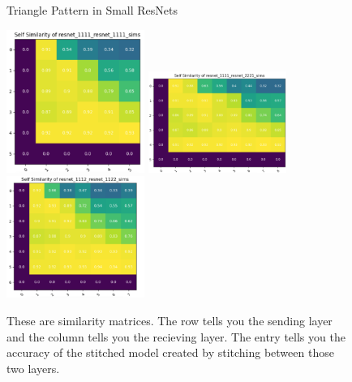 \documentclass{article} %
\begin{document}
\begin{center}
   \begin{figure}[h!]
      \centering
      \caption{Triangle Pattern in Small ResNets}
      \includegraphics[width=4.5cm]{resnet1111_1111.png}
      \includegraphics[width=4.5cm]{resnet1111_2221.png}
      \includegraphics[width=4.5cm]{resnet1112_1122.png}
      \caption*{These are similarity matrices. The row tells you the sending layer and the column tells you the recieving layer.
      The entry tells you the accuracy of the stitched model created by stitching between those two layers.}
   \end{figure}
\end{center}
\end{document}
